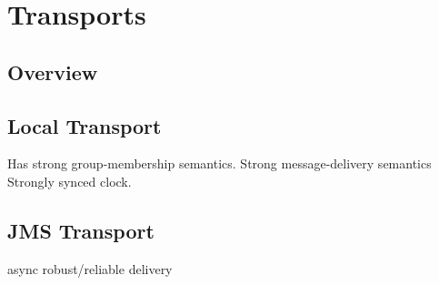
\chapter{Transports}

\section{Overview}

\section{Local Transport}

Has strong group-membership semantics.
Strong message-delivery semantics
Strongly synced clock.

\section{JMS Transport}

async
robust/reliable delivery
